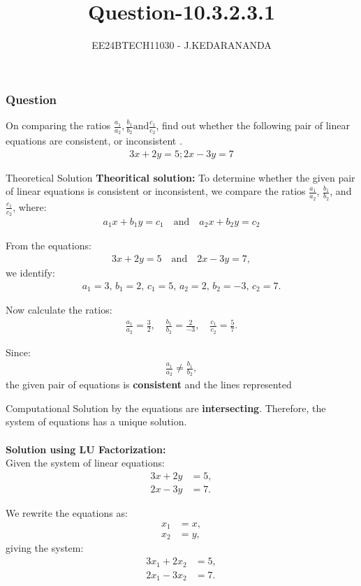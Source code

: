 \documentclass{beamer}
\title{Question-10.3.2.3.1}
\author{EE24BTECH11030 - J.KEDARANANDA}
\date{}
\begin{document}
	
	\frame{\titlepage}
	
	\begin{frame}
		\frametitle{Question}
		On comparing the ratios $\frac{a_1}{a_2},\frac{b_1}{b_2} \text{and} \frac{c_1}{c_2}$, find out whether the following pair of linear equations are consistent, or inconsistent . 
		\begin{align}
			3x + 2y = 5 ; 2x - 3y = 7
		\end{align}
	\end{frame}
	\begin{frame}{Theoretical Solution}
		\textbf{Theoritical solution:}
		To determine whether the given pair of linear equations is consistent or inconsistent, we compare the ratios $\frac{a_1}{a_2}$, $\frac{b_1}{b_2}$, and $\frac{c_1}{c_2}$, where:
		\begin{align}
			a_1x + b_1y = c_1 \quad \text{and} \quad a_2x + b_2y = c_2
		\end{align}
		
		From the equations:
		\begin{align}
			3x + 2y = 5 \quad \text{and} \quad 2x - 3y = 7,
		\end{align}
		we identify:
		\begin{align}
			a_1 = 3, \, b_1 = 2, \, c_1 = 5, \, a_2 = 2, \, b_2 = -3, \, c_2 = 7.
		\end{align}
		
		Now calculate the ratios:
		\begin{align}
			\frac{a_1}{a_2} = \frac{3}{2}, \quad \frac{b_1}{b_2} = \frac{2}{-3}, \quad \frac{c_1}{c_2} = \frac{5}{7}.
		\end{align}
		
		Since:
		\begin{align}
			\frac{a_1}{a_2} \neq \frac{b_1}{b_2},
		\end{align}
		the given pair of equations is \textbf{consistent} and the lines represented 
	\end{frame}
	\begin{frame}{Computational Solution}
		by the equations are \textbf{intersecting}. Therefore, the system of equations has a unique solution.\\\\
		\textbf{Solution using LU Factorization:}\\
		Given the system of linear equations:
		\begin{align}
			3x + 2y &= 5, \label{eq1} \\
			2x - 3y &= 7. \label{eq2}
		\end{align}
		
		We rewrite the equations as:
		\begin{align}
			x_1 &= x, \\
			x_2 &= y,
		\end{align}
		giving the system:
		\begin{align}
			3x_1 + 2x_2 &= 5, \label{eq3} \\
			2x_1 - 3x_2 &= 7. \label{eq4}
		\end{align}
	\end{frame}
\end{document}
